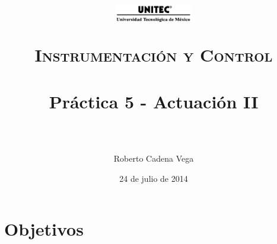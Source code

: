 



\title{	
	\normalfont \normalsize
	\begin{figure}[h]
		\begin{center}
			\includegraphics[width=0.3\textwidth]{../images/UNITEC.png} %
		\end{center}
	\end{figure}
	\textsc{Instrumentación y Control} \\ [25pt]
	\horrule{0.5pt} \\[0.4cm] %
	\huge Práctica 5 - Actuación II \\ %
	\horrule{2pt} \\[0.5cm] %
}

\author{Roberto Cadena Vega} %

\date{\normalsize 24 de julio de 2014} %




\maketitle %


\section{Objetivos}

